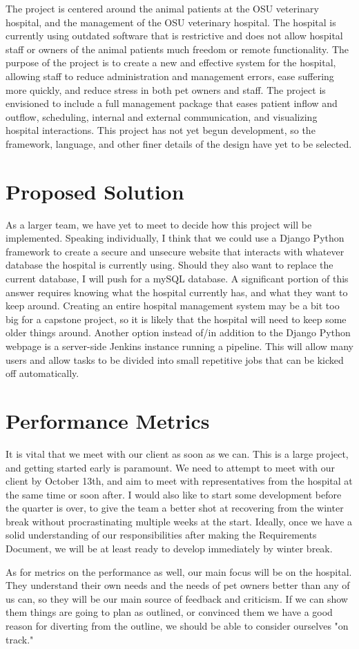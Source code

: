 \documentclass[10pt,peerreview,draftclsnofoot,onecolumn,final,margin=0.75in]{IEEEtran}
\begin{document}
The project is centered around the animal patients at the OSU veterinary hospital, and the management of the
OSU veterinary hospital. The hospital is currently using outdated software that is restrictive and does 
not allow hospital staff or owners of the animal patients much freedom or remote functionality. The purpose of
the project is to create a new and effective system for the hospital, allowing staff to reduce administration 
and management errors, ease suffering more quickly, and reduce stress in both pet owners and staff. The project
is envisioned to include a full management package that eases patient inflow and outflow, scheduling, internal and 
external communication, and visualizing hospital interactions. This project has not yet begun development, so the
framework, language, and other finer details of the design have yet to be selected.

\section{Proposed Solution}
As a larger team, we have yet to meet to decide how this project will be implemented. Speaking individually, I think
that we could use a Django Python framework to create a secure and unsecure website that interacts with whatever database
the hospital is currently using. Should they also want to replace the current database, I will push for a mySQL database.
A significant portion of this answer requires knowing what the hospital currently has, and what they want to keep around.
Creating an entire hospital management system may be a bit too big for a capstone project, so it is likely that the hospital
will need to keep some older things around. Another option instead of/in addition to the Django Python webpage is a server-side 
Jenkins instance running a pipeline. This will allow many users and allow tasks to be divided into small repetitive jobs that 
can be kicked off automatically.

\section{Performance Metrics}
It is vital that we meet with our client as soon as we can. This is a large project, and getting started early is paramount.
We need to attempt to meet with our client by October 13th, and aim to meet with representatives from the hospital at the same 
time or soon after. I would also like to start some development before the quarter is over, to give the team a better shot at 
recovering from the winter break without procrastinating multiple weeks at the start. Ideally, once we have a solid understanding 
of our responsibilities after making the Requirements Document, we will be at least ready to develop immediately by winter break.

As for metrics on the performance as well, our main focus will be on the hospital. They understand their own needs and the needs of pet
owners better than any of us can, so they will be our main source of feedback and criticism. If we can show them things are going to plan
as outlined, or convinced them we have a good reason for diverting from the outline, we should be able to consider ourselves "on track."
\end{document}
